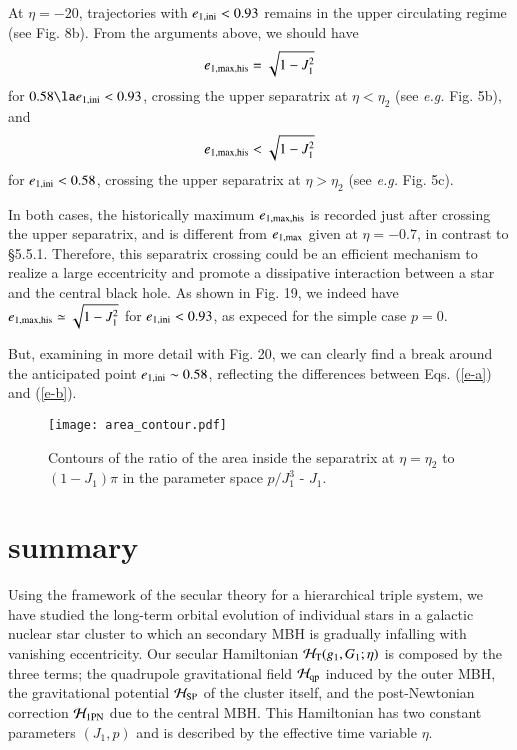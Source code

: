 \documentclass[useAMS,usenatbib,twocolumn]{mn2e}
\newcommand{\beq}{\begin{equation}}
\newcommand{\eeq}{\end{equation}}
\newcommand{\lsim}{\la}
\begin{document}
At $\eta=-20$, trajectories with $e_{\rm 1,ini}<0.93$ remains in the upper circulating regime (see Fig. 8b).  From the arguments above, we should have
\beq
e_{\rm 1,max,his}=\sqrt{1-J_1^2} \label{e-a}
\eeq
for $0.58\lsim e_{\rm 1,ini}<0.93$, crossing the upper separatrix at $\eta<\eta_2$ (see {\it e.g.} Fig. 5b), and
\beq
e_{\rm 1,max,his}<\sqrt{1-J_1^2} \label{e-b}
\eeq
for $ e_{\rm 1,ini}<0.58$, crossing the upper separatrix at $\eta>\eta_2$  (see {\it e.g.} Fig. 5c).

In both cases, the historically maximum $e_{\rm 1,max,his}$ is recorded just after crossing the upper separatrix, and is different from $e_{\rm 1,max}$ given at $\eta=-0.7$, in contrast to \S 5.5.1. Therefore, this separatrix crossing could be an efficient mechanism to realize a large eccentricity and promote a dissipative interaction between a star and the central black hole. 
As shown in Fig. 19, we indeed have $e_{\rm 1,max,his}\simeq \sqrt{1-J_1^2}$ for $e_{\rm 1,ini}<0.93$, as expeced for the simple case $p=0$.

But, examining in more detail with Fig. 20, we can clearly find a break around the anticipated point $e_{\rm 1,ini}\sim 0.58$, reflecting the differences between Eqs. (\ref{e-a}) and (\ref{e-b}).  
\fi%






\begin{figure}
\begin{center}
\texttt{[image: area\_contour.pdf]}
\caption{Contours of the ratio of the area inside the separatrix
at $\eta=\eta_2$ to $(1-J_1)\pi$ in the parameter space
$p/J_{1}^{3}$ - $J_1$.}
\label{fig:phase}
\end{center}
\end{figure}
\fi%



\section{summary}

Using the framework of the secular theory for a hierarchical triple system, we have studied the long-term orbital evolution of individual stars in a galactic nuclear star cluster to which an secondary MBH is gradually infalling with vanishing eccentricity. Our secular Hamiltonian $\mathcal{H}_{\rm T}(g_{1}, G_{1};\eta)$ is composed by the three terms; the quadrupole gravitational field 
$\mathcal{H}_{\rm qp}$ induced by the outer MBH, the gravitational potential $\mathcal{H}_{\rm SP} $ of the cluster itself,  and the post-Newtonian correction $\mathcal{H}_{\rm 1PN}$ due to the central MBH. This Hamiltonian has two  constant  parameters $(J_1,p)$ and is described by the effective time variable $\eta$.  
\end{document}
